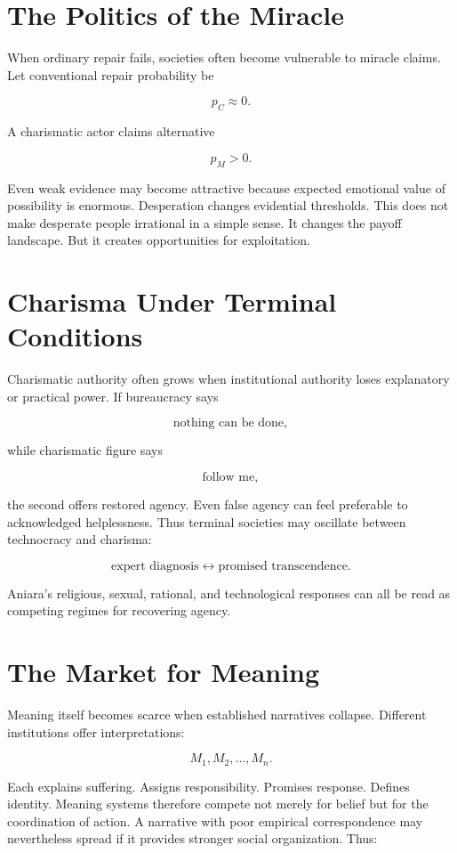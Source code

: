 \documentclass[11pt,oneside]{book}
\theoremstyle{definition}
\theoremstyle{remark}
\begin{document}
\section{The Politics of the Miracle}

When ordinary repair fails, societies often become vulnerable to miracle claims. Let conventional
repair probability be

\[
p_C\approx0.
\]

A charismatic actor claims alternative

\[
p_M>0.
\]

Even weak evidence may become attractive because expected emotional value of possibility is
enormous. Desperation changes evidential thresholds. This does not make desperate people irrational
in a simple sense. It changes the payoff landscape. But it creates opportunities for exploitation.

\section{Charisma Under Terminal Conditions}

Charismatic authority often grows when institutional authority loses explanatory or practical power.
If bureaucracy says

\[
\text{nothing can be done},
\]

while charismatic figure says

\[
\text{follow me},
\]

the second offers restored agency. Even false agency can feel preferable to acknowledged
helplessness. Thus terminal societies may oscillate between technocracy and charisma:

\[
\text{expert diagnosis} \leftrightarrow \text{promised transcendence}.
\]

Aniara's religious, sexual, rational, and technological responses can all be read as competing
regimes for recovering agency.

\section{The Market for Meaning}

Meaning itself becomes scarce when established narratives collapse. Different institutions offer
interpretations:

\[
M_1,M_2,\ldots,M_n.
\]

Each explains suffering. Assigns responsibility. Promises response. Defines identity. Meaning
systems therefore compete not merely for belief but for the coordination of action. A narrative with
poor empirical correspondence may nevertheless spread if it provides stronger social organization.
Thus:
\end{document}
